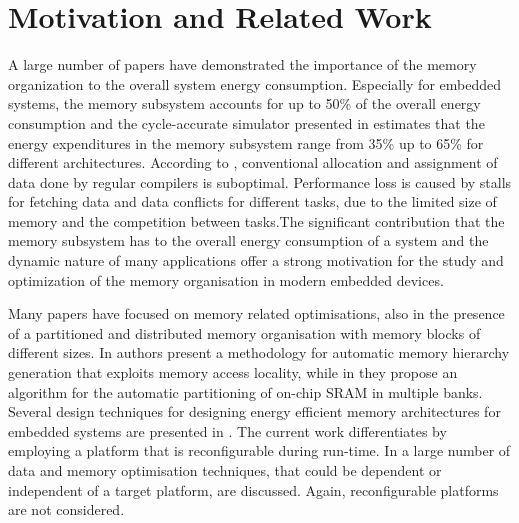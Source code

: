 
\section{Motivation and Related Work}

A large number of papers have demonstrated the importance of the memory organization to the overall system energy consumption. Especially for embedded systems, the memory subsystem accounts for up to 50\% of the overall energy consumption \cite{Che09} and the cycle-accurate simulator presented in \cite{Ben99} estimates that the energy expenditures in the memory subsystem range from 35\% up to 65\% for different architectures. According to \cite{tcm}, conventional allocation and assignment of data done by regular compilers is suboptimal. Performance loss is caused by stalls for fetching data and data conflicts for different tasks, due to the limited size of memory and the competition between tasks.The significant contribution that the memory subsystem has to the overall energy consumption of a system and the dynamic nature of many applications offer a strong motivation for the study and optimization of the memory organisation in modern embedded devices.

Many papers have focused on memory related optimisations, also in the presence of a partitioned and distributed memory organisation with memory blocks of different sizes. In \cite{Ben00b} authors present a methodology for automatic memory hierarchy generation that exploits memory access locality, while in \cite{Ben00c} they propose an algorithm for the automatic partitioning of on-chip SRAM in multiple banks. Several design techniques for designing energy efficient memory architectures for embedded systems are presented in \cite{Mac02}. The current work differentiates by employing a platform that is reconfigurable during run-time. In \cite{Pgk01} a large number of data and memory optimisation techniques, that could be dependent or independent of a target platform, are discussed. Again, reconfigurable platforms are not considered.


